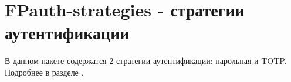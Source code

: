 \section{FPauth-strategies - стратегии аутентификации\label{fpauth-strategies---стратегии-аутентификации}}\label{page-FPauth-strategies-leaf-page-index}%
В данном пакете содержатся 2 стратегии аутентификации: парольная и TOTP. Подробнее в разделе
\hyperref[page-FPauth-strategies-module-FPauth+u+strategies]{}{}.


